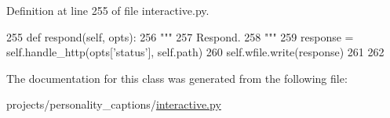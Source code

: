Definition at line 255 of file interactive.\+py.


\begin{DoxyCode}
255     \textcolor{keyword}{def }respond(self, opts):
256         \textcolor{stringliteral}{"""}
257 \textcolor{stringliteral}{        Respond.}
258 \textcolor{stringliteral}{        """}
259         response = self.handle\_http(opts[\textcolor{stringliteral}{'status'}], self.path)
260         self.wfile.write(response)
261 
262 
\end{DoxyCode}


The documentation for this class was generated from the following file\+:\begin{DoxyCompactItemize}
\item 
projects/personality\+\_\+captions/\hyperlink{projects_2personality__captions_2interactive_8py}{interactive.\+py}\end{DoxyCompactItemize}
